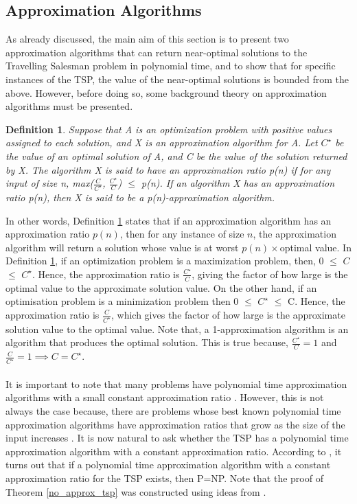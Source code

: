 \documentclass[12pt]{article}
\newtheorem{definition}{Definition}[subsection]
\numberwithin{equation}{subsection}
\numberwithin{table}{subsection}
\numberwithin{algorithm}{subsection}
\begin{document}
\subsection{Approximation Algorithms}
\label{approx_section}
As already discussed, the main aim of this section is to present two approximation algorithms that can return near-optimal solutions to the Travelling Salesman problem in polynomial time, and to show that for specific instances of the TSP, the value of the near-optimal solutions is bounded from the above. However, before doing so, some background theory on approximation algorithms must be presented.
\begin{definition}
\label{p(n)-approximation algorithm}
Suppose that A is an optimization problem with positive values assigned to each solution, and X is an approximation algorithm for A. Let $C^\star$ be the value of an optimal solution of A, and C be the value of the solution returned by X. The algorithm X is said to have an approximation ratio p(n) if for any input of size n, max($\frac{C}{C^\star}$, $\frac{C^\star}{C}$) $\leq$ p(n). If an algorithm X has an approximation ratio p(n), then X is said to be a p(n)-approximation algorithm. {}
\end{definition}
In other words, Definition \ref{p(n)-approximation algorithm} states that if an approximation algorithm has an approximation ratio $p(n)$, then for any instance of size $n$, the approximation algorithm will return a solution whose value is at worst $p(n)\times$optimal value. In Definition \ref{p(n)-approximation algorithm}, if an optimization problem is a maximization problem, then, 0 $\le$ $C$ $\leq$ $C^\star$. Hence, the approximation ratio is $\frac{C^\star}{C}$, giving the factor of how large is the optimal value to the approximate solution value. On the other hand, if an optimisation problem is a minimization problem then 0 $\le$ $C^\star$ $\leq$ C. Hence, the approximation ratio is $\frac{C}{C^\star}$, which gives the factor of how large is the approximate solution value to the optimal value. Note that, a 1-approximation algorithm is an algorithm that produces the optimal solution. This is true because, $\frac{C^\star}{C} = 1$ and $\frac{C}{C^\star} = 1 \implies C = C^\star$. \cite{cormen_leiserson_rivest_stein}
\\\\
It is important to note that many problems have polynomial time approximation algorithms with a small constant approximation ratio \cite{cormen_leiserson_rivest_stein}. However, this is not always the case because, there are problems whose best known polynomial time approximation algorithms have approximation ratios that grow as the size of the input increases \cite{cormen_leiserson_rivest_stein}. It is now natural to ask whether the TSP has a polynomial time approximation algorithm with a constant approximation ratio. According to \cite{cormen_leiserson_rivest_stein}, it turns out that if a polynomial time approximation algorithm with a constant approximation ratio for the TSP exists, then P=NP. Note that the proof of Theorem \ref{no_approx_tsp} was constructed using ideas from \cite{cormen_leiserson_rivest_stein}.
\end{document}
